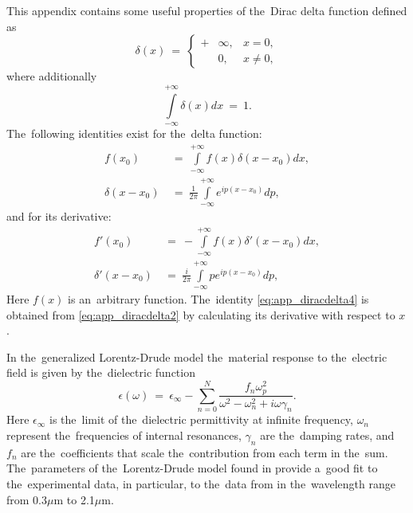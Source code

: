 
This appendix contains some useful properties of the~Dirac delta function defined as
\begin{equation}
\delta(x)~=~\left\{
\begin{aligned}
+&\infty, &x=0,\\
&0, &x\neq 0,
\end{aligned}\right.
\end{equation}
where additionally
\begin{equation}
\int\limits_{-\infty}^{+\infty}\delta(x)dx~=~1.
\end{equation}
The~following identities exist for the~delta function:
\begin{align}
\label{eq:app_diracdelta1}
f(x_0)~&=~\int\limits_{-\infty}^{+\infty} f(x)\delta(x-x_0)dx,\\
\label{eq:app_diracdelta2}
\delta(x-x_0)~&=~\frac{1}{2\pi} \int\limits_{-\infty}^{+\infty} e^{ip(x-x_0)}dp,
\end{align}
and for its derivative:
\begin{align}
\label{eq:app_diracdelta3}
f'(x_0)~&=~-\int\limits_{-\infty}^{+\infty} f(x)\delta'(x-x_0)dx,\\
\label{eq:app_diracdelta4}
\delta'(x-x_0)~&=~\frac{i}{2\pi} \int\limits_{-\infty}^{+\infty} p e^{ip(x-x_0)}dp,
\end{align}
Here $f(x)$ is an~arbitrary function.
The~identity \eqref{eq:app_diracdelta4} is obtained from \eqref{eq:app_diracdelta2} by calculating its derivative with respect to $x$.





In the~generalized Lorentz-Drude model the~material response to the~electric field is given by the~dielectric function
\begin{equation}
\label{app_lorentzdrude}
\epsilon(\omega)~=~\epsilon_{\infty} - \sum\limits_{n=0}^{N}\frac{f_n \omega_p^2}{\omega^2-\omega_{n}^2+i\omega\gamma_n}.
\end{equation}
Here $\epsilon_{\infty}$ is the~limit of the~dielectric permittivity at infinite frequency, $\omega_{n}$ represent the~frequencies of internal resonances, $\gamma_n$ are the~damping rates, and $f_n$ are the~coefficients that scale the~contribution from each term in the~sum.
The~parameters of the~Lorentz-Drude model found in \cite{rakic} provide a~good fit to the~experimental data, in particular, to the~data from \cite{johnson} in the~wavelength range from 0.3$\mu$m to 2.1$\mu$m.

